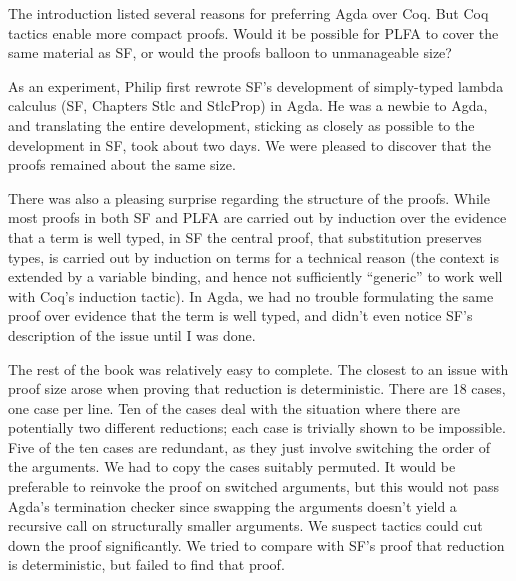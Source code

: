 \documentclass[preprint,authoryear]{elsarticle}
\begin{document}
The introduction listed several reasons for preferring Agda over Coq.
But Coq tactics enable more compact proofs. Would it be possible for
PLFA to cover the same material as SF, or would the proofs
balloon to unmanageable size?

As an experiment, Philip first rewrote SF's development of simply-typed lambda
calculus (SF, Chapters Stlc and StlcProp) in Agda.  He was a newbie to Agda, and
translating the entire development, sticking as closely as possible to the
development in SF, took about two days.  We were pleased to discover that the
proofs remained about the same size.

There was also a pleasing surprise regarding the structure of the
proofs. While most proofs in both SF and PLFA are carried out by
induction over the evidence that a term is well typed, in SF the
central proof, that substitution preserves types, is carried out by
induction on terms for a technical reason
(the context is extended by a variable binding, and hence not
sufficiently ``generic'' to work well with Coq's induction tactic). In
Agda, we had no trouble formulating the same proof over evidence that
the term is well typed, and didn't even notice SF's description of the
issue until I was done.

The rest of the book was relatively easy to complete.  The closest to
an issue with proof size arose when proving that reduction is
deterministic.  There are 18 cases, one case per line.  Ten of the
cases deal with the situation where there are potentially two
different reductions; each case is trivially shown to be
impossible.  Five of the ten cases are redundant, as they just involve
switching the order of the arguments.  We had to copy the cases
suitably permuted. It would be preferable to reinvoke the proof on
switched arguments, but this would not pass Agda's termination checker
since swapping the arguments doesn't yield a recursive call on
structurally smaller arguments.  We suspect tactics could cut down the
proof significantly. We tried to compare with SF's proof that reduction
is deterministic, but failed to find that proof.
\end{document}
